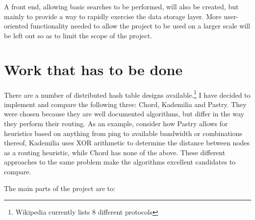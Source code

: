 A front end, allowing basic searches to be performed, will also be created, but mainly to provide a way to rapidly exercise the data storage layer. More user-oriented functionality needed to allow the project to be used on a larger scale will be left out so as to limit the scope of the project.

\section*{Work that has to be done}

There are a number of distributed hash table designs available.\footnote{ Wikipedia currently lists 8 different protocols } I have decided to implement and compare the following three: Chord, Kademilia and Pastry. They were chosen because they are well documented algorithms, but differ in the way they perform their routing. As an example, consider how Pastry allows for heuristics based on anything from ping to available bandwidth or combinations thereof, Kademilia uses XOR arithmetic to determine the distance between nodes as a routing heuristic, while Chord has none of the above. These different approaches to the same problem make the algorithms excellent candidates to compare.

The main parts of the project are to:

